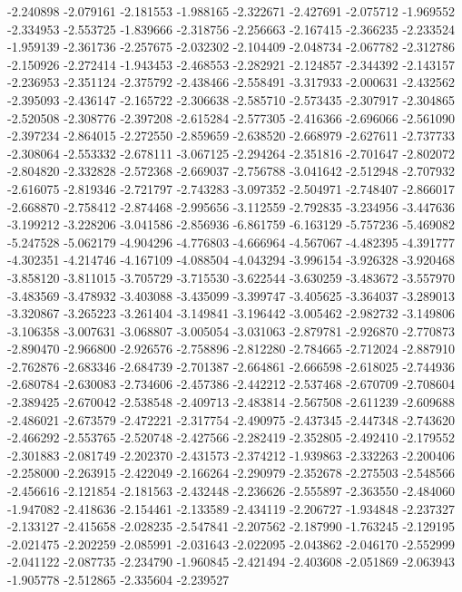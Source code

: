 -2.240898
-2.079161
-2.181553
-1.988165
-2.322671
-2.427691
-2.075712
-1.969552
-2.334953
-2.553725
-1.839666
-2.318756
-2.256663
-2.167415
-2.366235
-2.233524
-1.959139
-2.361736
-2.257675
-2.032302
-2.104409
-2.048734
-2.067782
-2.312786
-2.150926
-2.272414
-1.943453
-2.468553
-2.282921
-2.124857
-2.344392
-2.143157
-2.236953
-2.351124
-2.375792
-2.438466
-2.558491
-3.317933
-2.000631
-2.432562
-2.395093
-2.436147
-2.165722
-2.306638
-2.585710
-2.573435
-2.307917
-2.304865
-2.520508
-2.308776
-2.397208
-2.615284
-2.577305
-2.416366
-2.696066
-2.561090
-2.397234
-2.864015
-2.272550
-2.859659
-2.638520
-2.668979
-2.627611
-2.737733
-2.308064
-2.553332
-2.678111
-3.067125
-2.294264
-2.351816
-2.701647
-2.802072
-2.804820
-2.332828
-2.572368
-2.669037
-2.756788
-3.041642
-2.512948
-2.707932
-2.616075
-2.819346
-2.721797
-2.743283
-3.097352
-2.504971
-2.748407
-2.866017
-2.668870
-2.758412
-2.874468
-2.995656
-3.112559
-2.792835
-3.234956
-3.447636
-3.199212
-3.228206
-3.041586
-2.856936
-6.861759
-6.163129
-5.757236
-5.469082
-5.247528
-5.062179
-4.904296
-4.776803
-4.666964
-4.567067
-4.482395
-4.391777
-4.302351
-4.214746
-4.167109
-4.088504
-4.043294
-3.996154
-3.926328
-3.920468
-3.858120
-3.811015
-3.705729
-3.715530
-3.622544
-3.630259
-3.483672
-3.557970
-3.483569
-3.478932
-3.403088
-3.435099
-3.399747
-3.405625
-3.364037
-3.289013
-3.320867
-3.265223
-3.261404
-3.149841
-3.196442
-3.005462
-2.982732
-3.149806
-3.106358
-3.007631
-3.068807
-3.005054
-3.031063
-2.879781
-2.926870
-2.770873
-2.890470
-2.966800
-2.926576
-2.758896
-2.812280
-2.784665
-2.712024
-2.887910
-2.762876
-2.683346
-2.684739
-2.701387
-2.664861
-2.666598
-2.618025
-2.744936
-2.680784
-2.630083
-2.734606
-2.457386
-2.442212
-2.537468
-2.670709
-2.708604
-2.389425
-2.670042
-2.538548
-2.409713
-2.483814
-2.567508
-2.611239
-2.609688
-2.486021
-2.673579
-2.472221
-2.317754
-2.490975
-2.437345
-2.447348
-2.743620
-2.466292
-2.553765
-2.520748
-2.427566
-2.282419
-2.352805
-2.492410
-2.179552
-2.301883
-2.081749
-2.202370
-2.431573
-2.374212
-1.939863
-2.332263
-2.200406
-2.258000
-2.263915
-2.422049
-2.166264
-2.290979
-2.352678
-2.275503
-2.548566
-2.456616
-2.121854
-2.181563
-2.432448
-2.236626
-2.555897
-2.363550
-2.484060
-1.947082
-2.418636
-2.154461
-2.133589
-2.434119
-2.206727
-1.934848
-2.237327
-2.133127
-2.415658
-2.028235
-2.547841
-2.207562
-2.187990
-1.763245
-2.129195
-2.021475
-2.202259
-2.085991
-2.031643
-2.022095
-2.043862
-2.046170
-2.552999
-2.041122
-2.087735
-2.234790
-1.960845
-2.421494
-2.403608
-2.051869
-2.063943
-1.905778
-2.512865
-2.335604
-2.239527
